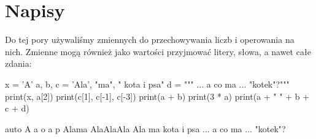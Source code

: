 % 
% 
% 
% 

\section{Napisy}
Do tej pory używaliśmy zmiennych do przechowywania liczb i operowania na nich. Zmienne mogą również jako wartości przyjmować litery, słowa, a nawet całe zdania:

\begin{CodeFrame}[python]{.5\textwidth}
x = 'A'
a, b, c = 'Ala', "ma", " kota i psa"
d = """ ... a co ma ...
 "kotek"?"""
print(x, a[2])
print(c[1], c[-1], c[-3])
print(a + b)
print(3 * a)
print(a + " " + b + c + d)
\end{CodeFrame}
\begin{CodeFrame}{auto}
A a
o a p
Alama
AlaAlaAla
Ala ma kota i psa ... a co ma ...
 "kotek"?
\end{CodeFrame}

